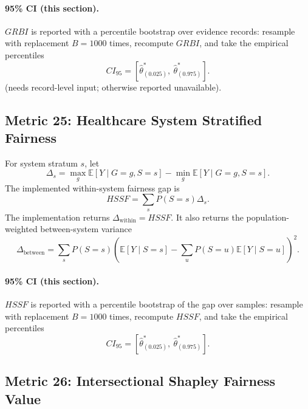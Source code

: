 \documentclass[11pt]{article}
\newcommand{\E}{\mathbb{E}}
\begin{document}
\paragraph{95\% CI (this section).} $GRBI$ is reported with a percentile bootstrap over evidence records: resample with replacement $B=1000$ times, recompute $GRBI$, and take the empirical percentiles
\begin{equation}
CI_{95}=\left[\hat\theta^{\ast}_{(0.025)},\ \hat\theta^{\ast}_{(0.975)}\right].
\end{equation} (needs record-level input; otherwise reported unavailable).

\subsection{Metric 25: Healthcare System Stratified Fairness}

For system stratum $s$, let
\begin{equation}
\Delta_s=\max_g \E[Y\mid G=g,S=s]-\min_g \E[Y\mid G=g,S=s].
\end{equation}
The implemented within-system fairness gap is
\begin{equation}
HSSF=\sum_s P(S=s)\Delta_s.
\end{equation}
The implementation returns $\Delta_{\mathrm{within}}=HSSF$. It also returns the
population-weighted between-system variance
\begin{equation}
\Delta_{\mathrm{between}}=
\sum_s P(S=s)\left(\E[Y\mid S=s]-\sum_{u}P(S=u)\E[Y\mid S=u]\right)^2.
\end{equation}


\paragraph{95\% CI (this section).} $HSSF$ is reported with a percentile bootstrap of the gap over samples: resample with replacement $B=1000$ times, recompute $HSSF$, and take the empirical percentiles
\begin{equation}
CI_{95}=\left[\hat\theta^{\ast}_{(0.025)},\ \hat\theta^{\ast}_{(0.975)}\right].
\end{equation}

\subsection{Metric 26: Intersectional Shapley Fairness Value}
\end{document}
